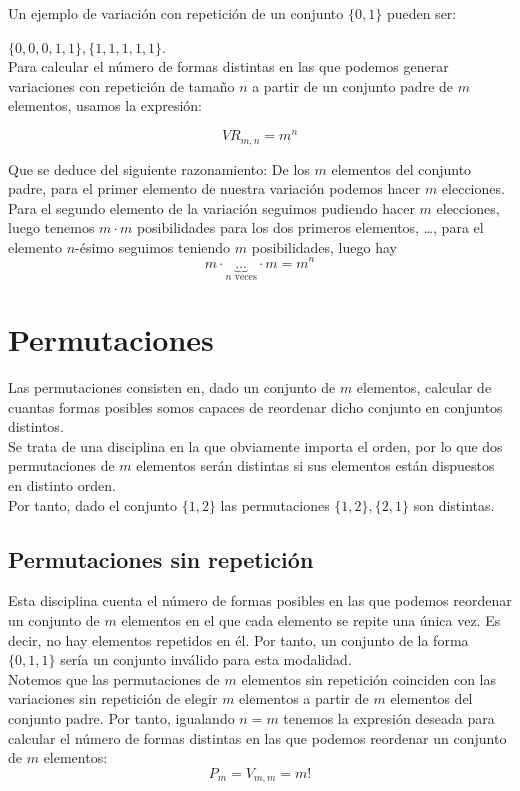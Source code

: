 Un ejemplo de variación con repetición de un conjunto $\{0, 1\}$ pueden ser:

$\{0, 0, 0, 1, 1\},
  \{1, 1, 1, 1, 1\}$.\\


Para calcular el número de formas distintas en las que podemos generar variaciones con repetición de tamaño
$n$ a partir de un conjunto padre de $m$ elementos, usamos la expresión:

$$VR_{m, n} = m^n$$


Que se deduce del siguiente razonamiento: De los $m$ elementos del conjunto padre, para el primer elemento
de nuestra variación podemos hacer $m$ elecciones. Para el segundo elemento de la variación seguimos
pudiendo hacer $m$ elecciones, luego tenemos $m \cdot m$ posibilidades para los dos primeros elementos, \ldots,
para el elemento $n$-ésimo seguimos teniendo $m$ posibilidades, luego hay
$$m \cdot \underbrace{\ldots}_{\mbox{$n$ veces}} \cdot m = m^n$$

\section{Permutaciones}

Las permutaciones consisten en, dado un conjunto de $m$ elementos, calcular de cuantas formas posibles
somos capaces de reordenar dicho conjunto en conjuntos distintos.\\


Se trata de una disciplina en la que obviamente importa el orden, por lo que dos permutaciones de $m$
elementos serán distintas si sus elementos están dispuestos en distinto orden.\\


Por tanto, dado el conjunto $\{1, 2\}$ las permutaciones $\{1, 2\}, \{2, 1\}$ son distintas.

\subsection{Permutaciones sin repetición}

Esta disciplina cuenta el número de formas posibles en las que podemos reordenar un conjunto de $m$ elementos
en el que cada elemento se repite una única vez. Es decir, no hay elementos repetidos en él. Por tanto, un
conjunto de la forma $\{0, 1, 1\}$ sería un conjunto inválido para esta modalidad.\\


Notemos que las permutaciones de $m$ elementos sin repetición coinciden con las variaciones sin repetición
de elegir $m$ elementos a partir de $m$ elementos del conjunto padre. Por tanto, igualando $n=m$ tenemos
la expresión deseada para calcular el número de formas distintas en las que podemos reordenar un conjunto
de $m$ elementos:
$$P_m = V_{m, m} = m!$$


